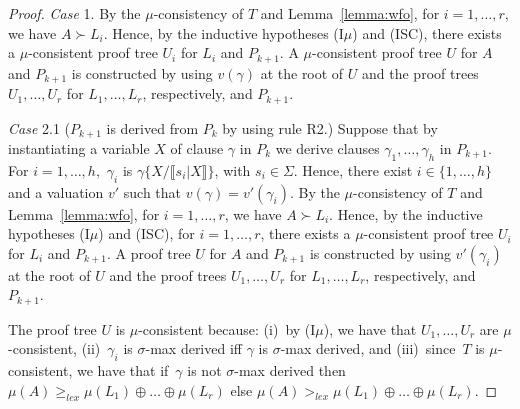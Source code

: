 \documentclass[english]{tlp}
\renewcommand{\mathit}{\displaystyle}
\begin{document}
\begin{proof}
\medskip

\noindent \emph{Case} 1. By the $\mu$-consistency of $T$ and
Lemma~\ref{lemma:wfo}, for \( i=1,\ldots ,r \),  we have $A \succ
L_i$. Hence, by the inductive hypotheses (I$\mu$) and (ISC), there
exists a $\mu$-consistent proof tree \(U_{i} \) for \( L_{i} \) and
\( P_{k+1} \). A $\mu$-consistent proof tree $U$ for $A$ and $
P_{k+1}$ is constructed by using $v(\gamma)$ at the root 
of $U$ and the proof trees
$U_1,\ldots,U_r$ for $L_1,\ldots,L_r$, respectively, and $P_{k+1}$.

\medskip

\noindent \emph{Case} 2.1 ($P_{k+1}$ is derived from $P_k$ by using
rule R2.) Suppose that by instantiating a variable $X$ of clause
$\gamma$ in $P_k$ we derive clauses $\gamma_1,\ldots,\gamma_h$ in
$P_{k+1}$. For $i=1,\ldots,h,$ $\gamma_i$ is $\gamma\{X/\llbracket
s_i|X\rrbracket \}$, with $s_i\in\Sigma$. Hence, there exist
$i\in\{1,\ldots,h\}$ and a valuation $v'$ such that
$v(\gamma)=v'(\gamma_i)$.  By the $\mu$-consistency of $T$ and
Lemma~\ref{lemma:wfo}, for \( i=1,\ldots ,r \), we have $A \succ
L_i$. Hence, by the inductive hypotheses (I$\mu$) and (ISC), 
for \( i=1,\ldots ,r \), there
exists a $\mu$-consistent proof tree \(U_{i} \) for \( L_{i} \) and
\( P_{k+1} \). A  proof tree $U$ for $A$ and $
P_{k+1}$ is constructed by using $v'(\gamma_i)$ at the root of
$U$ and the proof trees
$U_1,\ldots,U_r$ for $L_1,\ldots,L_r$,  respectively, and $P_{k+1}$.

The proof tree $U$ is $\mu$-consistent because: (i)~by (I$\mu$), 
we have that  $U_1,\ldots,U_r$ are $\mu$-consistent,
(ii)~$\gamma_i$ is 
$\sigma$-max derived iff $\gamma$ is 
$\sigma$-max derived, and (iii)~since~$T$ is $\mu$-consistent,
we have that if~$\gamma$ is not $\sigma$-max derived then 
$\mu(A)\geq_{\mathit{lex}} \mu(L_1)\oplus\ldots\oplus\mu(L_r)$
else $\mu(A)>_{\mathit{lex}} \mu(L_1)\oplus\ldots\oplus\mu(L_r)$.

\medskip 


\end{proof}
\end{document}
